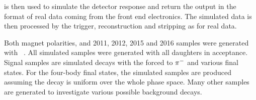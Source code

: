 \boole is then used to simulate the detector response and return the output in the format of real data coming from the front end electronics. The simulated data is then processed by the trigger, reconstruction and stripping as for real data.

Both magnet polarities, and 2011, 2012, 2015 and 2016 samples were generated with ~\cite{Sjostrand:2007gs}. All simulated samples were generated with all daughters in \lhcb acceptance. Signal samples are simulated \btodkst decays with the \Kstarm forced to \KS${{\pi}^-}$ and various \D final states. For the four-body \D final states, the simulated samples are produced assuming the \D decay is uniform over the whole phase space. Many other samples are generated to investigate various possible background decays.
